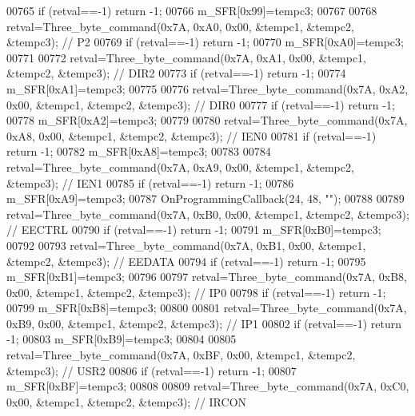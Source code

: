 \begin{DoxyCode}
{{{{{{{{{{{{{{{00765     \textcolor{keywordflow}{if} (retval==-1) \textcolor{keywordflow}{return} -1;
00766     m_SFR[0x99]=tempc3;
00767 
00768     retval=Three_byte_command(0x7A, 0xA0, 0x00, &tempc1, &tempc2, &tempc3); \textcolor{comment}{// P2}
00769     \textcolor{keywordflow}{if} (retval==-1) \textcolor{keywordflow}{return} -1;
00770     m_SFR[0xA0]=tempc3;
00771 
00772     retval=Three_byte_command(0x7A, 0xA1, 0x00, &tempc1, &tempc2, &tempc3); \textcolor{comment}{// DIR2}
00773     \textcolor{keywordflow}{if} (retval==-1) \textcolor{keywordflow}{return} -1;
00774     m_SFR[0xA1]=tempc3;
00775 
00776     retval=Three_byte_command(0x7A, 0xA2, 0x00, &tempc1, &tempc2, &tempc3); \textcolor{comment}{// DIR0}
00777     \textcolor{keywordflow}{if} (retval==-1) \textcolor{keywordflow}{return} -1;
00778     m_SFR[0xA2]=tempc3;
00779 
00780     retval=Three_byte_command(0x7A, 0xA8, 0x00, &tempc1, &tempc2, &tempc3); \textcolor{comment}{// IEN0}
00781     \textcolor{keywordflow}{if} (retval==-1) \textcolor{keywordflow}{return} -1;
00782     m_SFR[0xA8]=tempc3;
00783 
00784     retval=Three_byte_command(0x7A, 0xA9, 0x00, &tempc1, &tempc2, &tempc3); \textcolor{comment}{// IEN1}
00785     \textcolor{keywordflow}{if} (retval==-1) \textcolor{keywordflow}{return} -1;
00786     m_SFR[0xA9]=tempc3;
00787         OnProgrammingCallback(24, 48, \textcolor{stringliteral}{""});
00788 
00789     retval=Three_byte_command(0x7A, 0xB0, 0x00, &tempc1, &tempc2, &tempc3); \textcolor{comment}{// EECTRL}
00790     \textcolor{keywordflow}{if} (retval==-1) \textcolor{keywordflow}{return} -1;
00791         m_SFR[0xB0]=tempc3;
00792 
00793     retval=Three_byte_command(0x7A, 0xB1, 0x00, &tempc1, &tempc2, &tempc3); \textcolor{comment}{// EEDATA}
00794     \textcolor{keywordflow}{if} (retval==-1) \textcolor{keywordflow}{return} -1;
00795     m_SFR[0xB1]=tempc3;
00796 
00797     retval=Three_byte_command(0x7A, 0xB8, 0x00, &tempc1, &tempc2, &tempc3); \textcolor{comment}{// IP0}
00798     \textcolor{keywordflow}{if} (retval==-1) \textcolor{keywordflow}{return} -1;
00799     m_SFR[0xB8]=tempc3;
00800 
00801     retval=Three_byte_command(0x7A, 0xB9, 0x00, &tempc1, &tempc2, &tempc3); \textcolor{comment}{// IP1}
00802     \textcolor{keywordflow}{if} (retval==-1) \textcolor{keywordflow}{return} -1;
00803     m_SFR[0xB9]=tempc3;
00804 
00805     retval=Three_byte_command(0x7A, 0xBF, 0x00, &tempc1, &tempc2, &tempc3); \textcolor{comment}{// USR2}
00806     \textcolor{keywordflow}{if} (retval==-1) \textcolor{keywordflow}{return} -1;
00807     m_SFR[0xBF]=tempc3;
00808 
00809     retval=Three_byte_command(0x7A, 0xC0, 0x00, &tempc1, &tempc2, &tempc3); \textcolor{comment}{// IRCON}
}}}}}}}}}}}}}}}
\end{DoxyCode}
